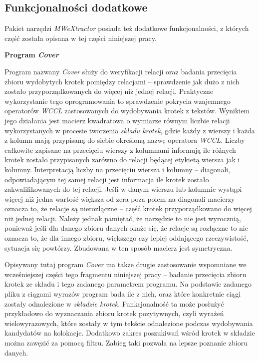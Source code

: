 \documentclass[11pt,a4paper]{llncs}
\begin{document}


\subsection{Funkcjonalności dodatkowe}
Pakiet narzędzi \emph{MWeXtractor} posiada też dodatkowe funkcjonalności, z których część została opisana w tej części niniejszej pracy.


\noindent\textbf{Program \textit{Cover}}


Program nazwany \emph{Cover} służy do weryfikacji relacji oraz badania przecięcia zbioru wydobytych krotek pomiędzy relacjami -- sprawdzenie jak dużo z nich zostało przyporządkowanych do więcej niż jednej relacji.
Praktyczne wykorzystanie tego oprogramowania to sprawdzenie pokrycia wzajemnego operatorów \emph{WCCL} zastosowanych do wydobywania krotek z tekstów.
Wynikiem jego działania jest macierz kwadratowa o wymiarze równym liczbie relacji wykorzystanych w procesie tworzenia \emph{składu krotek}, gdzie każdy z wierszy i każda z kolumn mają przypisaną do siebie określoną nazwę operatora \emph{WCCL}.
Liczby całkowite zapisane na przecięciu wierszy z kolumnami informują ile różnych krotek zostało przypisanych zarówno do relacji będącej etykietą wiersza jak i kolumny.
Interpretacją liczby na przecięciu wiersza i kolumny -- diagonali, odpowiadającym tej samej relacji jest informacja ile krotek zostało zakwalifikowanych do tej relacji.
Jeśli w danym wierszu lub kolumnie wystąpi więcej niż jedna wartość większa od zera poza polem na diagonali macierzy oznacza to, że relacje są nierozłączne -- część krotek przyporządkowano do więcej niż jednej relacji.
Należy jednak pamiętać, że narzędzie to nie jest wyrocznią, ponieważ jeśli dla danego zbioru danych okaże się, że relacje są rozłączne to nie oznacza to, że dla innego zbioru, większego czy lepiej oddającego rzeczywistość, sytuacja się powtórzy.
Zbudowana w ten sposób macierz jest symetryczna.
\par
Opisywany tutaj program \emph{Cover} ma także drugie zastosowanie wspomniane we wcześniejszej części tego fragmentu niniejszej pracy -- badanie przecięcia zbioru krotek ze składu i tego zadanego parametrem programu.
Na podstawie zadanego pliku z ciągami wyrazów program bada ile z nich, oraz które konkretnie ciągi zostały odnalezione w \emph{składzie krotek}.
Funkcjonalność ta może posłużyć przykładowo do wyznaczania zbioru krotek pozytywnych, czyli wyrażeń wielowyrazowych, które zostały w tym tekście odnalezione podczas wydobywania kandydatów na kolokacje.
Dodatkowo zakres poszukiwań wśród krotek w składzie można zawęzić za pomocą filtru.
Zabieg taki pozwala na lepsze poznanie zbioru danych.
\end{document}
